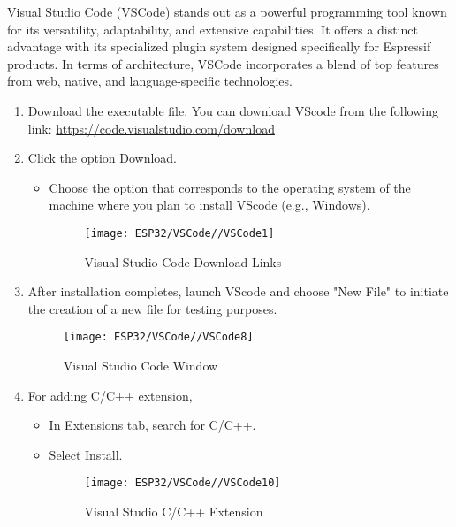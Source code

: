 Visual Studio Code (VSCode) stands out as a powerful programming tool known for its versatility, adaptability, and extensive capabilities. It offers a distinct advantage with its specialized plugin system designed specifically for Espressif products. In terms of architecture, VSCode incorporates a blend of top features from web, native, and language-specific technologies.
\begin{enumerate}
    \item Download the executable file.
    You can download VScode from the following link:
    \href{https://code.visualstudio.com/download}{https://code.visualstudio.com/download}
    
    \item Click the option Download.
    \begin{itemize}
        \item Choose the option that corresponds to the operating system of the machine where you plan to install VScode (e.g., Windows).
        
        \begin{figure}[H]
            \centering
            \texttt{[image: ESP32/VSCode//VSCode1]}
            \caption{Visual Studio Code Download Links} 
        \end{figure}
    \end{itemize}
    
    
    
    \item After installation completes, launch VScode and choose "New File" to initiate the creation of a new file for testing purposes.
    \begin{figure}[H]
        \centering
        \texttt{[image: ESP32/VSCode//VSCode8]}
        \caption{Visual Studio Code Window} 
    \end{figure}
    
    \item	For adding C/C++ extension,
    \begin{itemize}
        \item In Extensions tab, search for C/C++.
        \item Select Install.
        
        \begin{figure}[H]
            \centering
            \texttt{[image: ESP32/VSCode//VSCode10]}
            \caption{Visual Studio C/C++ Extension} 
        \end{figure}
    \end{itemize}
    
    
\end{enumerate}

